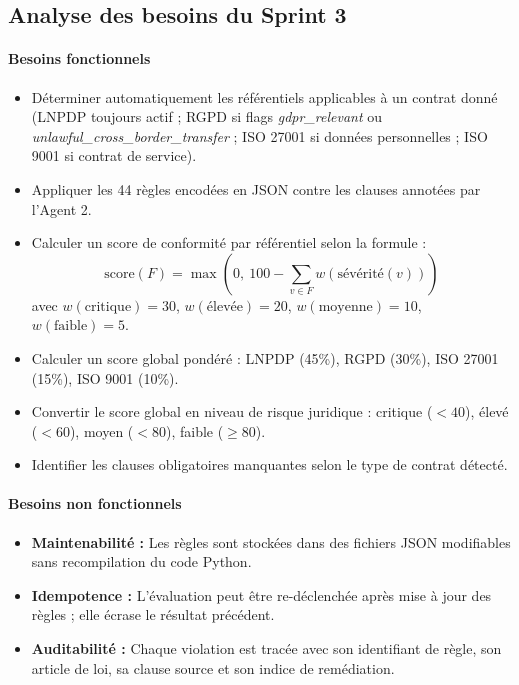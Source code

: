\subsection{Analyse des besoins du Sprint 3}

\paragraph{Besoins fonctionnels}
\begin{itemize}
    \item Déterminer automatiquement les référentiels applicables à un contrat donné (LNPDP toujours actif ; RGPD si flags \textit{gdpr\_relevant} ou \textit{unlawful\_cross\_border\_transfer} ; ISO 27001 si données personnelles ; ISO 9001 si contrat de service).
    \item Appliquer les 44 règles encodées en JSON contre les clauses annotées par l'Agent 2.
    \item Calculer un score de conformité par référentiel selon la formule : \[ \text{score}(F) = \max\left(0,\ 100 - \sum_{v \in F} w(\text{sévérité}(v))\right) \] avec $w(\text{critique})=30$, $w(\text{élevée})=20$, $w(\text{moyenne})=10$, $w(\text{faible})=5$.
    \item Calculer un score global pondéré : LNPDP (45\%), RGPD (30\%), ISO 27001 (15\%), ISO 9001 (10\%).
    \item Convertir le score global en niveau de risque juridique : critique ($< 40$), élevé ($< 60$), moyen ($< 80$), faible ($\geq 80$).
    \item Identifier les clauses obligatoires manquantes selon le type de contrat détecté.
\end{itemize}

\paragraph{Besoins non fonctionnels}
\begin{itemize}
    \item \textbf{Maintenabilité :} Les règles sont stockées dans des fichiers JSON modifiables sans recompilation du code Python.
    \item \textbf{Idempotence :} L'évaluation peut être re-déclenchée après mise à jour des règles ; elle écrase le résultat précédent.
    \item \textbf{Auditabilité :} Chaque violation est tracée avec son identifiant de règle, son article de loi, sa clause source et son indice de remédiation.
\end{itemize}

